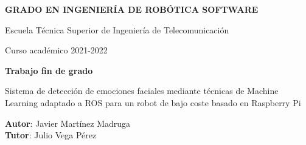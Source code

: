 \thispagestyle{empty}
\vspace{2cm}

\begin{figure}[htb]
  \centerline{}
\end{figure}

\begin{center}
  {\Large {\bf GRADO EN INGENIERÍA DE ROBÓTICA SOFTWARE}}
  \vspace{5mm}
 
  {\large {Escuela Técnica Superior de Ingeniería de Telecomunicación}}
  \vspace{5mm}

  {\large {Curso académico 2021-2022}}

  \vspace{1cm}

  {\large {\bf Trabajo fin de grado}}

  \vspace{2cm}

  {\Large {Sistema de detección de emociones faciales mediante técnicas de Machine Learning adaptado a ROS para un robot de bajo coste basado en Raspberry Pi\\[1cm] }}

  \vspace{5cm}
  {\bf Autor}: Javier Martínez Madruga \\
  {\bf Tutor}: Julio Vega Pérez
\end{center}

\clearpage
\thispagestyle{empty}
